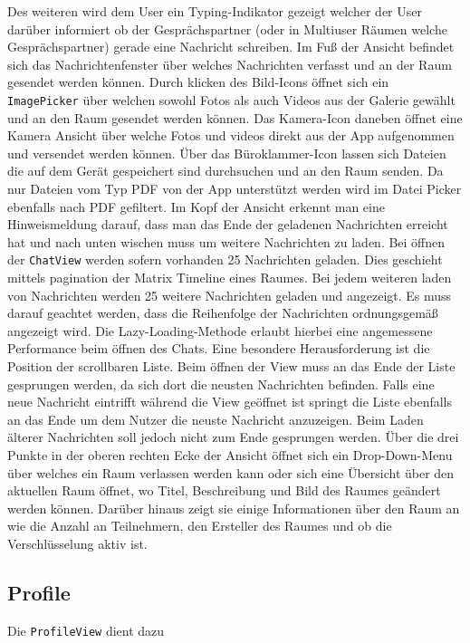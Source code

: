     Des weiteren wird dem User ein Typing-Indikator gezeigt welcher der User darüber informiert ob der Gesprächspartner (oder in Multiuser Räumen welche Gesprächspartner) gerade eine Nachricht schreiben.
    Im Fuß der Ansicht befindet sich das Nachrichtenfenster über welches Nachrichten verfasst und an der Raum gesendet werden können.
    Durch klicken des Bild-Icons öffnet sich ein \texttt{ImagePicker} über welchen sowohl Fotos als auch Videos aus der Galerie gewählt und an den Raum gesendet werden können.
    Das Kamera-Icon daneben öffnet eine Kamera Ansicht über welche Fotos und videos direkt aus der App aufgenommen und versendet werden können.
    Über das Büroklammer-Icon lassen sich Dateien die auf dem Gerät gespeichert sind durchsuchen und an den Raum senden.
    Da nur Dateien vom Typ PDF von der App unterstützt werden wird im Datei Picker ebenfalls nach PDF gefiltert.
    Im Kopf der Ansicht erkennt man eine Hinweismeldung darauf, dass man das Ende der geladenen Nachrichten erreicht hat und nach unten wischen muss um weitere Nachrichten zu laden.
    Bei öffnen der \texttt{ChatView} werden sofern vorhanden 25 Nachrichten geladen.
    Dies geschieht mittels pagination der Matrix Timeline eines Raumes.
    Bei jedem weiteren laden von Nachrichten werden 25 weitere Nachrichten geladen und angezeigt.
    Es muss darauf geachtet werden, dass die Reihenfolge der Nachrichten ordnungsgemäß angezeigt wird.
    Die Lazy-Loading-Methode erlaubt hierbei eine angemessene Performance beim öffnen des Chats.
    Eine besondere Herausforderung ist die Position der scrollbaren Liste.
    Beim öffnen der View muss an das Ende der Liste gesprungen werden, da sich dort die neusten Nachrichten befinden.
    Falls eine neue Nachricht eintrifft während die View geöffnet ist springt die Liste ebenfalls an das Ende um dem Nutzer die neuste Nachricht anzuzeigen.
    Beim Laden älterer Nachrichten soll jedoch nicht zum Ende gesprungen werden.
    Über die drei Punkte in der oberen rechten Ecke der Ansicht öffnet sich ein Drop-Down-Menu über welches ein Raum verlassen werden kann oder sich eine Übersicht über den aktuellen Raum öffnet, wo Titel, Beschreibung und Bild des Raumes geändert werden können.
    Darüber hinaus zeigt sie einige Informationen über den Raum an wie die Anzahl an Teilnehmern, den Ersteller des Raumes und ob die Verschlüsselung aktiv ist.

    \newpage
    \subsection{Profile}\label{subsec:profile}
    Die \texttt{ProfileView} dient dazu

